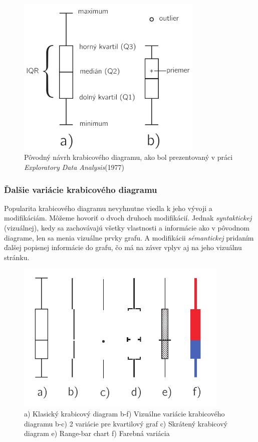 \begin{figure}
	\centering
	\includegraphics[width = 3.5in]{boxplot}
	\caption{Pôvodný návrh krabicového diagramu, ako bol prezentovaný v práci \textit{Exploratory Data Analysis}(1977) \cite{Tukey} }
	\label{fig:boxplot}
\end{figure}


\subsubsection{Ďalšie variácie krabicového diagramu}

Popularita krabicového diagramu nevyhnutne viedla k jeho vývoji a modifikáciám. Môžeme hovoriť o dvoch druhoch modifikácií. Jednak \textit{syntaktickej} (vizuálnej), kedy sa zachovávajú všetky vlastnosti a informácie ako v pôvodnom diagrame, len sa menia vizuálne prvky grafu. A modifikácii \textit{sémantickej} pridaním ďalšej popisnej informácie do grafu, čo má na záver vplyv aj na jeho vizuálnu stránku.


\begin{figure}
	\centering
	\includegraphics[width = 4in]{boxplot2}
	\caption{ a) Klasický krabicový diagram  b-f) Vizuálne variácie krabicového diagramu b-c) 2 variácie pre kvartilový graf \cite{Tufte83} c) Skrátený krabicový diagram \cite{VisualSummaryPotter} e) Range-bar chart \cite{Spear} f) Farebná variácia \cite{Carr}  }
	\label{fig:boxplotmodif1}
\end{figure}


